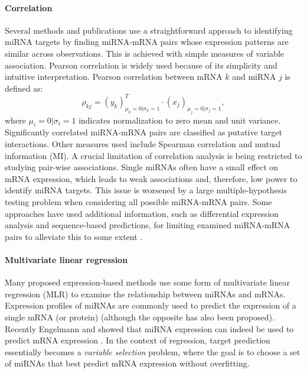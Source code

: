 \paragraph{Correlation}
Several methods and publications use a straightforward approach to identifying
miRNA targets by finding miRNA-mRNA pairs whose expression patterns are
similar across observations. This is achieved with simple measures of variable
association. Pearson correlation is widely used because of its simplicity
and intuitive interpretation. Pearson correlation between mRNA $k$ and miRNA
$j$ is defined as:
\begin{equation}
	\rho_{kj} = (y_k)_{\mu_k=0|\sigma_k=1}^T \cdot (x_j)_{\mu_j=0|\sigma_j=1},
	\label{eq:pearson}
\end{equation}
where $\mu_i=0|\sigma_i=1$ indicates normalization to zero mean and unit
variance. Significantly correlated miRNA-mRNA pairs are classified as putative
target interactions. Other measures used include Spearman correlation and
mutual information (MI). A crucial limitation of correlation analysis is being
restricted to studying pair-wise associations. Single miRNAs often have a
small effect on mRNA expression, which leads to weak associations and,
therefore, low power to identify miRNA targets. This issue is worsened by a
large multiple-hypothesis testing problem when considering all possible miRNA-mRNA
pairs. Some approaches have used additional information, such as
differential expression analysis and sequence-based predictions, for limiting
examined miRNA-mRNA pairs to alleviate this to some extent
\citep{Muniategui2013}.

\paragraph{Multivariate linear regression}
Many proposed expression-based methods use some form of multivariate linear
regression (MLR) to examine the relationship between miRNAs and mRNAs.
Expression profiles of miRNAs are commonly used to predict the expression of a
single mRNA (or protein) (although the opposite has also been proposed).
Recently Engelmann and showed that miRNA expression can indeed be used to
predict mRNA expression \citep{Engelmann2012}. In the context of regression,
target prediction essentially becomes a \emph{variable selection} problem, where the
goal is to choose a set of miRNAs that best predict mRNA expression without
overfitting.

